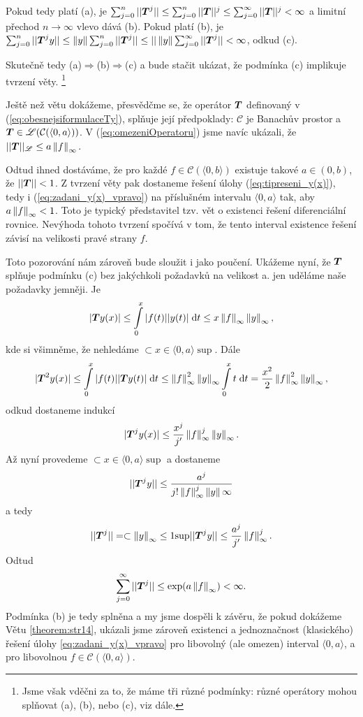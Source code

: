 Pokud tedy platí (a), je $\sum_{j=0}^n|| \boldsymbol{T} ^j||\leq\sum_{j=0}^n|| \boldsymbol{T} ||^j\leq \sum_{j=0}^\infty|| \boldsymbol{T} ||^j<\infty$ a limitní přechod $n\rightarrow \infty$ vlevo dává (b). Pokud platí (b), je $\sum_{j=0}^n|| \boldsymbol{T} ^jy||\leq\left\lVert y\right\rVert\sum_{j=0}^n|| \boldsymbol{T} ^j||\leq||\left\lVert y\right\rVert\sum_{j=0}^\infty|| \boldsymbol{T} ^j||<\infty$, odkud (c).

Skutečně tedy (a)$\Rightarrow$(b)$\Rightarrow$(c) a bude stačit ukázat, že podmínka (c) implikuje tvrzení věty. \footnote{Jsme však vděčni za to, že máme tři různé podmínky: různé operátory mohou splňovat (a), (b), nebo (c), viz dále.}
\item Ještě než větu dokážeme, přesvědčme se, že operátor $ \boldsymbol{T} $ definovaný v (\ref{eq:obesnejsiformulaceTy}), splňuje její předpoklady: $\mathcal{C}$ je Banachův prostor a $ \boldsymbol{T} \in\mathscr{L}(\mathcal{C}(\langle0,a\rangle))$. V (\ref{eq:omezeniOperatoru}) jsme navíc ukázali, že $|| \boldsymbol{T} ||_{\mathscr{L}}\leq a\left\lVert f\right\rVert_\infty.$

Odtud ihned dostáváme, že pro každé $f\in\mathcal{C}(\langle 0,b \rangle )$ existuje takové
$a\in (0,b)$, že $|| \boldsymbol{T} ||<1$.
Z tvrzení věty pak dostaneme  řešení úlohy (\ref{eq:tipreseni_y(x)}), tedy i (\ref{eq:zadani_y(x)_vpravo}) na příslušném  intervalu $\langle 0,a\rangle$
tak, aby $a\left\lVert f\right\rVert_\infty<1$. Toto je typický představitel tzv. vět o  existenci řešení diferenciální rovnice. Nevýhoda tohoto tvrzení spočívá v tom, že tento interval existence řešení závisí na velikosti pravé strany $f$.

Toto pozorování nám zároveň bude sloužit i jako poučení. Ukážeme nyní, že $ \boldsymbol{T} $ splňuje podmínku (c) bez jakýchkoli požadavků na velikost a. jen uděláme naše požadavky jemněji. Je 
$$| \boldsymbol{T} y(x)|\leq \int\limits_0^x|f(t)||y(t)|\;\mathrm{d}t\leq x\left\lVert f\right\rVert_\infty\left\lVert y\right\rVert_\infty,$$
kde si všimněme, že nehledáme $\subset{x\in\langle0,a\rangle}{\sup}$. Dále
$$| \boldsymbol{T} ^2y(x)|\leq\int\limits_0^x|f(t)|| \boldsymbol{T} y(t)|\;\mathrm{d}t\leq \left\lVert f\right\rVert^2_\infty\left\lVert y\right\rVert_\infty\int\limits_0^xt\;\mathrm{d}t = \frac{x^2}{2}\left\lVert f\right\rVert^2_\infty\left\lVert y\right\rVert_\infty,$$
odkud dostaneme indukcí
$$| \boldsymbol{T} ^jy(x)|\leq\frac{x^j}{j'}\left\lVert f\right\rVert^j_\infty\left\lVert y\right\rVert_\infty.$$
Až nyní provedeme $\subset{x\in\langle0,a\rangle}{\sup}$ a dostaneme 
$$|| \boldsymbol{T} ^jy||\leq\frac{a^j}{j!\left\lVert f\right\rVert^j_\infty\left\lVert y\right\rVert\infty}$$ a tedy 
$$|| \boldsymbol{T} ^j||=\subset{\left\lVert y\right\rVert_\infty\leq 1}{\sup}|| \boldsymbol{T} ^jy||\leq\frac{a^j}{j'}\left\lVert f\right\rVert^j_\infty.$$
Odtud $$\sum\limits_{j=0}^\infty|| \boldsymbol{T} ^j||\leq\exp(a\left\lVert f\right\rVert_\infty)<\infty.$$
Podmínka (b) je tedy splněna a my jsme dospěli k závěru, že pokud dokážeme Větu \ref{theorem:str14}, ukázali jsme zároveň existenci a jednoznačnost (klasického) řešení úlohy \ref{eq:zadani_y(x)_vpravo} pro libovolný (ale omezen) interval $\langle0,a\rangle$, a pro libovolnou $f\in\mathcal{C}(\langle0,a\rangle)$.

